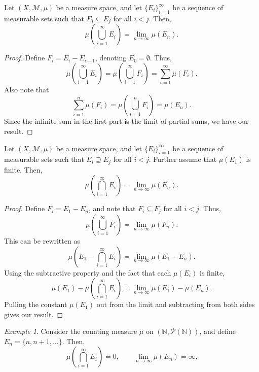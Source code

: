 \documentclass[11pt]{article}
\newcommand{\N}{\mathbb{N}}
\newcommand{\M}{\mathcal{M}}
\theoremstyle{definition}
\theoremstyle{remark}
\newtheorem*{example}{Example}
\numberwithin{equation}{section}
\begin{document}
    \begin{theorem}
        Let $(X, \M, \mu)$ be a measure space, and let $\{E_i\}_{i = 1}^\infty$
        be a sequence of measurable sets such that $E_i \subseteq E_j$ for all $i <
        j$. Then, \[
            \mu\left(\bigcup_{i = 1}^\infty E_i\right) = \lim_{n \to \infty}
            \mu(E_n).
        \]
    \end{theorem}
    \begin{proof}
        Define $F_i = E_i - E_{i - 1}$, denoting $E_0 = \emptyset$. Thus, \[
            \mu\left(\bigcup_{i = 1}^\infty E_i\right) = \mu\left(\bigcup_{i =
            1}^\infty F_i\right) = \sum_{i = 1}^\infty \mu(F_i).
        \] Also note that \[
            \sum_{i = 1}^n \mu(F_i) = \mu\left(\bigcup_{i = 1}^n F_i\right) =
            \mu(E_n).
        \] Since the infinite sum in the first part is the limit of partial sums, we
        have our result.
    \end{proof}

    \begin{theorem}
        Let $(X, \M, \mu)$ be a measure space, and let $\{E_i\}_{i = 1}^\infty$
        be a sequence of measurable sets such that $E_i \supseteq E_j$ for all $i <
        j$. Further assume that $\mu(E_1)$ is finite. Then, \[
            \mu\left(\bigcap_{i = 1}^\infty E_i\right) = \lim_{n \to \infty}
            \mu(E_n).
        \]
    \end{theorem}
    \begin{proof}
        Define $F_i = E_1 - E_n$, and note that $F_i \subseteq F_j$ for all $i < j$.
        Thus, \[
            \mu\left(\bigcup_{i = 1}^\infty F_i\right) = \lim_{n \to \infty}
            \mu(F_n).
        \] This can be rewritten as \[
            \mu\left(E_1 - \bigcap_{i = 1}^\infty E_i\right) = \lim_{n \to \infty}
            \mu(E_1 - E_n).
        \] Using the subtractive property and the fact that each $\mu(E_i)$ is
        finite, \[
            \mu(E_1) - \mu\left(\bigcap_{i = 1}^\infty E_i\right) = \lim_{n \to \infty}
            \mu(E_1) - \mu(E_n).
        \] Pulling the constant $\mu(E_1)$ out from the limit and subtracting from
        both sides gives our result.
    \end{proof}
    \begin{example}
        Consider the counting measure $\mu$ on $(\N, \mathcal{P}(\N))$, and define
        $E_n = \{n, n + 1, \dots \}$. Then, \[
            \mu\left(\bigcap_{i = 1}^\infty E_i\right) = 0, \qquad \lim_{n \to
            \infty} \mu(E_n) = \infty.
        \]
    \end{example}
\end{document}
